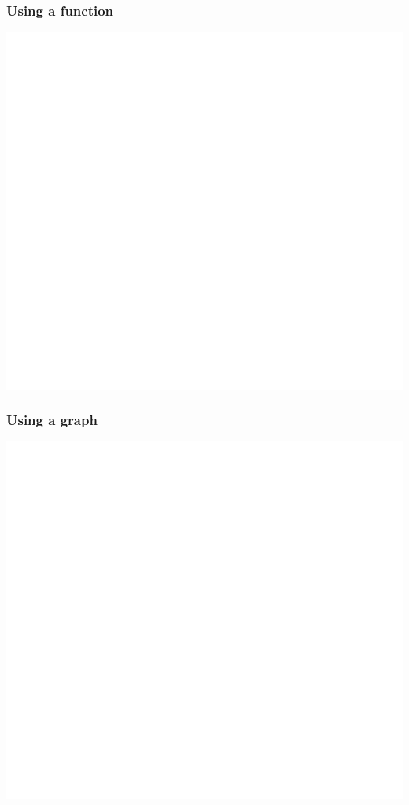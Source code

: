 \documentclass[]{book}
\begin{document}
\hypertarget{using-a-function}{%
\subsubsection{Using a function}\label{using-a-function}}

\begin{center}\includegraphics[width=1\linewidth]{figure/Ch1box6-1} \end{center}

\hypertarget{using-a-graph}{%
\subsubsection{Using a graph}\label{using-a-graph}}

\begin{center}\includegraphics[width=1\linewidth]{figure/Ch1box7-1} \end{center}
\end{document}
